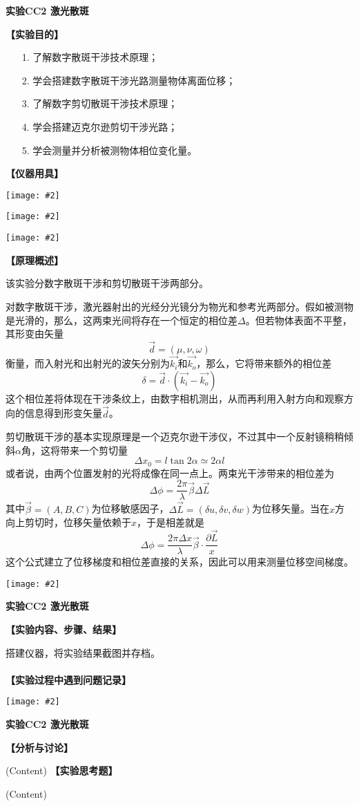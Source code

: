 \documentclass[11pt,a4paper]{ctexart}
\newcommand{\ExpeName}{实验CC2 激光散斑}
\newcommand{\emptyline}{\\ \ \\}
\newcommand{\cpic}[2]{
\begin{center}
\texttt{[image: \#2]}
\end{center}
}
\newcommand{\beq}{\begin{equation}}
\newcommand{\eeq}{\end{equation}}
\begin{document}
\newpage%
\begin{center}
\LARGE{\textbf{\ExpeName}}
\end{center}
\textbf{【实验目的】}
\begin{enumerate}
 \item[1.] 了解数字散斑干涉技术原理；
 \item[2.] 学会搭建数字散斑干涉光路测量物体离面位移；
 \item[3.] 了解数字剪切散斑干涉技术原理；
 \item[4.] 学会搭建迈克尔逊剪切干涉光路；
 \item[5.] 学会测量并分析被测物体相位变化量。
\end{enumerate}
\textbf{【仪器用具】}
\cpic{0.3}{t1}
\cpic{0.3}{t2}
\cpic{0.39}{t3}
\textbf{【原理概述】}\par
该实验分数字散斑干涉和剪切散斑干涉两部分。
\par
对数字散斑干涉，激光器射出的光经分光镜分为物光和参考光两部分。假如被测物是光滑的，那么，这两束光间将存在一个恒定的相位差$\varDelta$。但若物体表面不平整，其形变由矢量
\beq
\vec{d} = (\mu,\nu,\omega)
\eeq
衡量，而入射光和出射光的波矢分别为$\vec{k_i}$和$\vec{k_o}$，那么，它将带来额外的相位差
\beq
\delta = \vec{d} \cdot (\vec{k_i} - \vec{k_o})
\eeq
这个相位差将体现在干涉条纹上，由数字相机测出，从而再利用入射方向和观察方向的信息得到形变矢量$\vec{d}$。
\par
剪切散斑干涉的基本实现原理是一个迈克尔逊干涉仪，不过其中一个反射镜稍稍倾斜$\alpha$角，这将带来一个剪切量
\beq
\Delta x_0 = l \tan 2\alpha \simeq 2\alpha l
\eeq
或者说，由两个位置发射的光将成像在同一点上。两束光干涉带来的相位差为
\beq
\Delta \phi = \frac{2\pi}{\lambda} \vec{\beta} \Delta \vec{L}
\eeq
其中$\vec{\beta} = (A,B,C)$为位移敏感因子，$\Delta \vec{L} = (\delta u,\delta v,\delta w)$为位移矢量。当在$x$方向上剪切时，位移矢量依赖于$x$，于是相差就是
\beq
\Delta \phi = \frac{2\pi \Delta x}{\lambda} \vec{\beta} \cdot \frac{\partial \vec{L}}{x}
\eeq
这个公式建立了位移梯度和相位差直接的关系，因此可以用来测量位移空间梯度。


\newpage%
\cpic{0.255}{e2}%
\begin{center}
\LARGE{\textbf{\ExpeName}}
\end{center}
\textbf{【实验内容、步骤、结果】}
\par
搭建仪器，将实验结果截图并存档。
\emptyline
\textbf{【实验过程中遇到问题记录】}

%

\newpage%
\cpic{0.255}{e3}%
\begin{center}
\LARGE\textbf{{\ExpeName}}
\end{center}
\textbf{【分析与讨论】}\par
(Content)
\newline
\textbf{【实验思考题】}\par
(Content)
\end{document}
